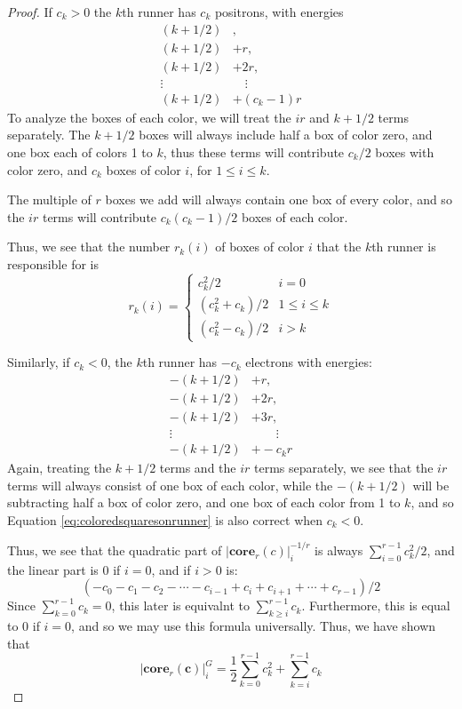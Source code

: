 \documentclass{amsart}[12pt]
\theoremstyle{definition}
\newcommand{\core}{\mathbf{core}}
\begin{document}
\begin{proof}
 If  $c_k>0$ the $k$th runner has $c_k$ positrons, with
 energies 
\begin{align*}
(k+1/2)&,\\
(k+1/2)&+r, \\
(k+1/2)&+2r,\\
\vdots\quad &\quad \vdots \\
 (k+1/2)&+(c_k-1)r
\end{align*}
To analyze the boxes of each color, we will treat the $ir$ and $k+1/2$ terms separately.  The $k+1/2$ boxes will always include half a box of color zero, and one box each of colors 1 to $k$, thus these terms will contribute $c_k/2$ boxes with color zero, and $c_k$ boxes of color $i$, for $1\leq i\leq k$.  

The multiple of $r$ boxes we add will always contain one box of every color, and so the $ir$ terms will contribute $c_k(c_k-1)/2$ boxes of each color.

Thus, we see that the number $r_k(i)$ of boxes of color $i$ that the $k$th runner is responsible for is
\begin{equation} \label{eq:coloredsquaresonrunner}
r_k(i)=  \left\{\begin{array}{ll}c_k^2/2 & i=0 \\  (c_k^2+c_k)/2 & 1 \leq i \leq k \\ (c_k^2-c_k)/2 & i>k \end{array}\right.\end{equation}

Similarly, if $c_k<0$, the $k$th runner has $-c_k$ electrons with energies:
\begin{align*}
-(k+1/2)&+r,\\
-(k+1/2)&+2r, \\
-(k+1/2)&+3r,\\
\vdots\quad &\qquad \vdots \\
-(k+1/2)&+-c_kr
\end{align*}
Again, treating the $k+1/2$ terms and the $ir$ terms separately, we see that the $ir$ terms will always consist of one box of each color, while the $-(k+1/2)$ will be subtracting half a box of color zero, and one box of each color from 1 to $k$, and so Equation \eqref{eq:coloredsquaresonrunner} is also correct when $c_k<0$.

Thus, we see that the quadratic part of $|\core_r(c)|_i^{-1/r}$ is always $\sum_{i=0}^{r-1} c_k^2/2$, and the linear part is 0 if $i=0$, and if $i>0$ is:
$$(-c_0-c_1-c_2-\cdots - c_{i-1}+c_i+c_{i+1}+\cdots+c_{r-1})/2$$
Since $\sum_{k=0}^{r-1} c_k=0$, this later is equivalnt to $\sum_{k\geq i}^{r-1} c_k$.  Furthermore, this is equal to 0 if $i=0$, and so we may use this formula universally.  Thus, we have shown that
$$|\core_r(\mathbf{c})|^G_i=\frac{1}{2}\sum_{k=0}^{r-1} c_k^2+ \sum^{r-1}_{k=i}c_k$$

\end{proof}
\end{document}
